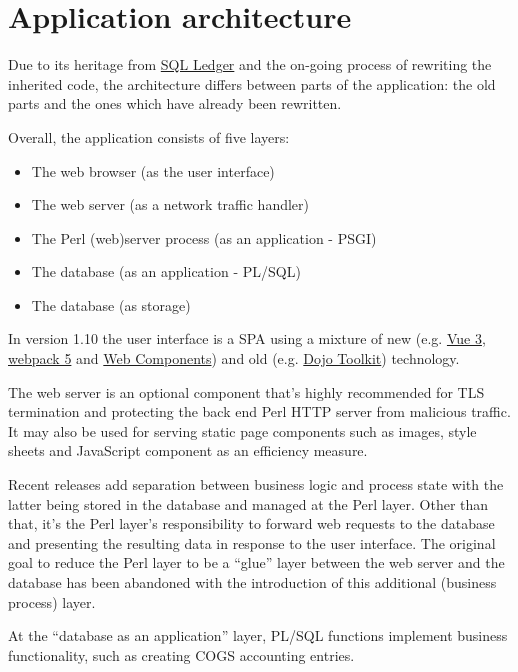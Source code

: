 \section{Application architecture}
\label{sec-ledgersmb-architecture}

Due to its heritage from \href{https://sql-ledger.com/}{SQL Ledger} and the on-going process of rewriting
the inherited code, the architecture differs between parts
of the application: the old parts and the ones which have already been
rewritten.

Overall, the application consists of five layers:

\begin{itemize}
\item The web browser (as the user interface)
\item The web server (as a network traffic handler)
\item The Perl (web)server process (as an application - \gls{PSGI})
\item The database (as an application - \gls{PL/SQL})
\item The database (as storage)
\end{itemize}

In version 1.10 the user interface is a \gls{SPA} using a mixture of new (e.g. 
\href{https://vuejs.org/}{Vue 3},
\href{https://webpack.js.org/}{webpack 5} and \href{https://developer.mozilla.org/en-US/docs/Web/Web_Components}{Web Components}) and old (e.g. \href{https://dojotoolkit.org/}{Dojo Toolkit}) technology.

The web server is an optional component that's highly recommended for TLS termination
and protecting the back end Perl HTTP server from malicious traffic. It may also be used
for serving static page components such as images, style sheets and JavaScript component
as an efficiency measure.

Recent releases add separation between business logic and process state with the
latter being stored in the database and managed at the Perl layer.  Other than that, it's the Perl layer's responsibility to forward web requests to the database and
presenting the resulting data in response to the user interface.
The original goal to reduce the Perl layer to be a ``glue'' layer between the web
server and the database has been abandoned with  the introduction of this additional
(business process) layer.

At the ``database as an application'' layer, \gls{PL/SQL} functions implement business
functionality, such as creating \gls{COGS} accounting entries.

